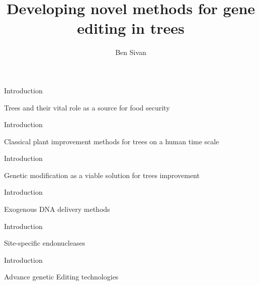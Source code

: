 \documentclass[
  ignorenonframetext,
]{beamer}
\title{Developing novel methods for gene editing in trees}
\author{Ben Sivan}
\date{}
\begin{document}
\frame{\titlepage}

\begin{frame}{Introduction}
\protect\hypertarget{introduction}{}
\begin{block}{Trees and their vital role as a source for food security}
\protect\hypertarget{trees-and-their-vital-role-as-a-source-for-food-security}{}
\end{block}
\end{frame}

\begin{frame}{Introduction}
\protect\hypertarget{introduction-1}{}
\begin{block}{Classical plant improvement methods for trees on a human
time scale}
\protect\hypertarget{classical-plant-improvement-methods-for-trees-on-a-human-time-scale}{}
\end{block}
\end{frame}

\begin{frame}{Introduction}
\protect\hypertarget{introduction-2}{}
\begin{block}{Genetic modification as a viable solution for trees
improvement}
\protect\hypertarget{genetic-modification-as-a-viable-solution-for-trees-improvement}{}
\end{block}
\end{frame}

\begin{frame}{Introduction}
\protect\hypertarget{introduction-3}{}
\begin{block}{Exogenous DNA delivery methods}
\protect\hypertarget{exogenous-dna-delivery-methods}{}
\end{block}
\end{frame}

\begin{frame}{Introduction}
\protect\hypertarget{introduction-4}{}
\begin{block}{Site-specific endonucleases}
\protect\hypertarget{site-specific-endonucleases}{}
\end{block}
\end{frame}

\begin{frame}{Introduction}
\protect\hypertarget{introduction-5}{}
\begin{block}{Advance genetic Editing technologies}
\protect\hypertarget{advance-genetic-editing-technologies}{}
\end{block}
\end{frame}
\end{document}
